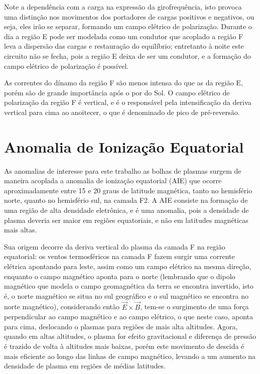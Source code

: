 Note a dependência com a carga na expressão da girofrequência, isto provoca uma distinção nos movimentos dos portadores de cargas positivos e negativos, ou seja, eles irão se separar, formando um campo elétrico de polarização. Durante o dia a região E pode ser modelada como um condutor que acoplado a região F leva a dispersão das cargas e restauração do equilíbrio; entretanto à noite este circuito não se fecha, pois a região E deixa de ser um condutor, e a formação do campo elétrico de polarização é possível.

As correntes do dínamo da região F são menos intensa do que as da região E, porém são de grande importância após o por do Sol. O campo elétrico de polarização da região F é vertical, e é o responsável pela intensificação da deriva vertical para cima ao anoitecer, o que é denominado de pico de pré-reversão.

\section{Anomalia de Ionização Equatorial}

As anomalias de interesse para este trabalho as bolhas de plasmas surgem de maneira acoplada a anomalia de ionização equatorial (AIE) que ocorre aproximadamente entre 15 e 20 graus de latitude magnética, tanto no hemisfério norte, quanto no hemisfério sul, na camada F2. A AIE consiste na formação de uma região de alta densidade eletrônica, e é uma anomalia, pois a densidade de plasma deveria ser maior em regiões equatoriais, e não em latitudes magnéticas mais altas.

Sua origem decorre da deriva vertical do plasma da camada F na região equatorial: os ventos termosféricos na camada F fazem surgir uma corrente elétrica apontando para leste, assim como um campo elétrico na mesma direção, enquanto o campo magnético aponta para o norte (lembrando que o dipolo magnético que modela o campo geomagnética da terra se encontra invertido, isto é, o norte magnético se situa no sul geográfico e o sul magnético se encontra no norte magnético), considerando então $\vec{E}\times\vec{B}$, tem-se o surgimento de uma força perpendicular ao campo magnético e ao campo elétrico, o que neste caso, aponta para cima, deslocando o plasmas para regiões de mais alta altitudes. Agora, quando em altas altitudes, o plasma for efeito gravitacional e diferença de pressão é trazido de volta à altitudes mais baixas, porém este movimento de descida é mais eficiente ao longo das linhas de campo magnético, levando a um aumento na densidade de plasma em regiões de médias latitudes.

